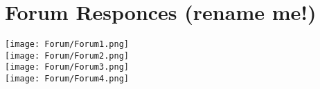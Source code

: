 \chapter{Forum Responces (rename me!)}
\texttt{[image: Forum/Forum1.png]} \\
\texttt{[image: Forum/Forum2.png]} \\
\texttt{[image: Forum/Forum3.png]} \\
\texttt{[image: Forum/Forum4.png]} \\